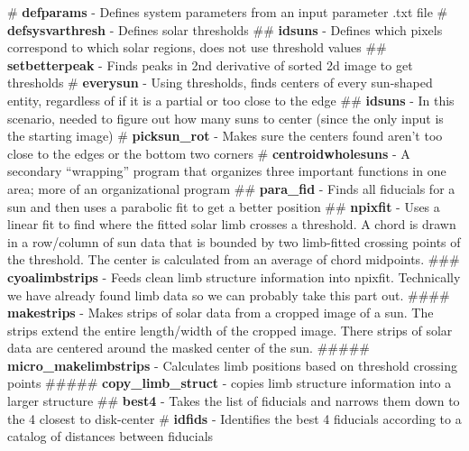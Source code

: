 \documentclass[10pt]{scrartcl}
\begin{document}
\begin{easylist}
# \textbf{defparams} - Defines system parameters from an input parameter .txt file
# \textbf{defsysvarthresh} - Defines solar thresholds
## \textbf{idsuns} - Defines which pixels correspond to which solar regions, does not use threshold values
## \textbf{setbetterpeak} - Finds peaks in 2nd derivative of sorted 2d image to get thresholds
# \textbf{everysun} - Using thresholds, finds centers of every sun-shaped entity, regardless of if it is a partial or too close to the edge
## \textbf{idsuns} - In this scenario, needed to figure out how many suns to center (since the only input is the starting image)
# \textbf{picksun\_rot} - Makes sure the centers found aren't too close to the edges or the bottom two corners
# \textbf{centroidwholesuns} - A secondary ``wrapping'' program that organizes three important functions in one area; more of an organizational program
## \textbf{para\_fid} - Finds all fiducials for a sun and then uses a parabolic fit to get a better position
## \textbf{npixfit} - Uses a linear fit to find where the fitted solar limb crosses a threshold. A chord is drawn in a row/column of sun data that is bounded by two limb-fitted crossing points of the threshold. The center is calculated from an average of chord midpoints.
### \textbf{cyoalimbstrips} - Feeds clean limb structure information into npixfit. Technically we have already found limb data so we can probably take this part out.
#### \textbf{makestrips} - Makes strips of solar data from a cropped image of a sun. The strips extend the entire length/width of the cropped image. There strips of solar data are centered around the masked center of the sun.
##### \textbf{micro\_makelimbstrips} - Calculates limb positions based on threshold crossing points
##### \textbf{copy\_limb\_struct} - copies limb structure information into a larger structure
## \textbf{best4} - Takes the list of fiducials and narrows them down to the 4 closest to disk-center
# \textbf{idfids} - Identifies the best 4 fiducials according to a catalog of distances between fiducials

\end{easylist}
\end{document}
